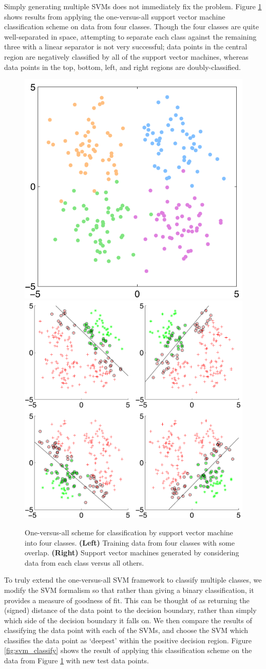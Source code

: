 \documentclass[12pt]{article}
\newcommand{\figlabel}[1]{\textbf{(#1)}}
\begin{document}
Simply generating multiple SVMs does not immediately fix the problem. Figure \ref{fig:svm_training} shows results from applying the one-versus-all support vector machine classification scheme on data from four classes. Though the four classes are quite well-separated in space, attempting to separate each class against the remaining three with a linear separator is not very successful; data points in the central region are negatively classified by all of the support vector machines, whereas data points in the top, bottom, left, and right regions are doubly-classified.
\begin{figure}[H]
\centering
\includegraphics[width=.4\textwidth]{figures/svm_trainingdata}
\includegraphics[width=.4\textwidth]{figures/svm_multiplesvms}
\caption{One-versus-all scheme for classification by support vector machine into four classes. \figlabel{Left} Training data from four classes with some overlap. \figlabel{Right} Support vector machines generated by considering data from each class versus all others.}
\label{fig:svm_training}
\end{figure}
To truly extend the one-versus-all SVM framework to classify multiple classes, we modify the SVM formalism so that rather than giving a binary classification, it provides a measure of goodness of fit. This can be thought of as returning the (signed) distance of the data point to the decision boundary, rather than simply which side of the decision boundary it falls on. We then compare the results of classifying the data point with each of the SVMs, and choose the SVM which classifies the data point as `deepest' within the positive decision region. Figure \ref{fig:svm_classify} shows the result of applying this classification scheme on the data from Figure \ref{fig:svm_training} with new test data points. 
\end{document}
